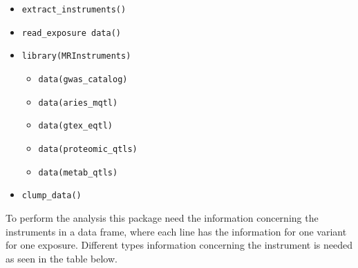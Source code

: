 \documentclass[
]{article}
\providecommand{\tightlist}{%
  \setlength{\itemsep}{0pt}\setlength{\parskip}{0pt}}
\begin{document}
\begin{itemize}
\tightlist
\item
  \texttt{extract\_instruments()}
\item
  \texttt{read\_exposure\ data()}
\item
  \texttt{library(MRInstruments)}

  \begin{itemize}
  \tightlist
  \item
    \texttt{data(gwas\_catalog)}
  \item
    \texttt{data(aries\_mqtl)}
  \item
    \texttt{data(gtex\_eqtl)}
  \item
    \texttt{data(proteomic\_qtls)}
  \item
    \texttt{data(metab\_qtls)}
  \end{itemize}
\item
  \texttt{clump\_data()}
\end{itemize}

To perform the analysis this package need the information concerning the
instruments in a data frame, where each line has the information for one
variant for one exposure. Different types information concerning the
instrument is needed as seen in the table below.
\end{document}
